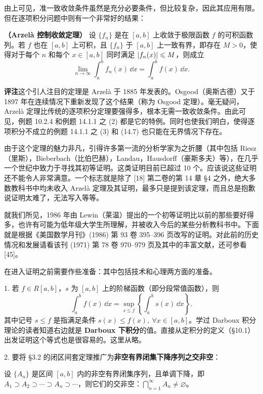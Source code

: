 由上可见，准一致收敛条件虽然是充分必要条件，但比较复杂，因此其应用有限。但在逐项积分问题中则有一个非常好的结果：

\begin{xproposition}[14.2.4]
\textbf{（Arzelà 控制收敛定理）} 设 $\{f_n\}$ 是在 $[a,b]$ 上收敛于极限函数 $f$ 的可积函数列。若 $f$ 也在 $[a,b]$ 上可积，且 $\{f_n\}$ 于 $[a,b]$ 上一致有界，即存在 $M>0$，使得对于每个 $n$ 和每个 $x\in[a,b]$ 同时满足 $\lvert f_n(x)\rvert\leqslant M$，则成立
\[
  \lim_{n\to\infty}\int_a^b f_n(x)\,\dd x=\int_a^b f(x)\,\dd x.
\]
\end{xproposition}

\textbf{评注}\quad 这个引人注目的定理是 Arzelà 于 1885 年发表的。Osgood（奥斯古德）又于 1897 年在连续情况下重新发现了这个结果（称为 Osgood 定理）。毫无疑问，Arzelà 定理比传统的逐项积分定理要强得多，根本无需一致收敛条件。由此可见，例题 10.2.4 和例题 14.1.1 之 (2) 都是它的特例。同时也使我们明白，使得逐项积分不成立的例题 14.1.1 之 (3) 和 (14.7) 也只能在无界情况下存在。

由于这个定理的魅力非凡，引得许多第一流的分析学家为之折腰（其中包括 Riesz（里斯），Bieberbach（比伯巴赫），Landau，Hausdorff（豪斯多夫）等），在几乎一个世纪中致力于寻找其初等证明。这类证明目前已超过 10 个。应该说这些证明还不能令人非常满意。一个标志就是除了 [18] 第二卷的第 14 章 §4 之外，绝大多数教科书中均未收入 Arzelà 定理及其证明，最多只是提到该定理，而且总是抱歉说证明太难了，无法写入等等。

就我们所见，1986 年由 Lewin（莱温）提出的一个初等证明比以前的那些要好得多，也许有可能为低年级大学生所理解，并被收入今后的某些分析教科书中。下面就是根据《美国数学月刊》(1986) 第 93 卷 395--396 页改写的证明。对此前的历史情况和发展请看该刊 (1971) 第 78 卷 970--979 页及其中的丰富文献，还可参看 [45]。

在进入证明之前需要作些准备：其中包括技术和心理两方面的准备。

1. 若 $f\in R[a,b]$，$s$ 为 $[a,b]$ 上的阶梯函数（即分段常值函数），则
\begin{equation}
  \int_a^b f(x)\,\dd x=\sup_{s\leqslant f}\left\{\int_a^b s(x)\,\dd x\right\}.
  \tag{14.9}
  \label{eq:14.9}
\end{equation}
其中记号 $s\leqslant f$ 是指满足条件 $s(x)\leqslant f(x),\ \forall x\in[a,b]$。学过 Darboux 积分理论的读者知道右边就是 \textbf{Darboux 下积分}的值。直接从定积分的定义（§10.1）出发证明这个等式也是很容易的。这里从略。

2. 要将 §3.2 的闭区间套定理推广为\textbf{非空有界闭集下降序列之交非空}：

\begin{xtheorem}
设 $\{A_n\}$ 是区间 $[a,b]$ 内的非空有界闭集序列，且单调下降，即 $A_1\supset A_2\supset\cdots\supset A_n\supset\cdots$，则它们的交非空：$\displaystyle\bigcap_{n=1}^{\infty}A_n\ne\varnothing$。
\end{xtheorem}

